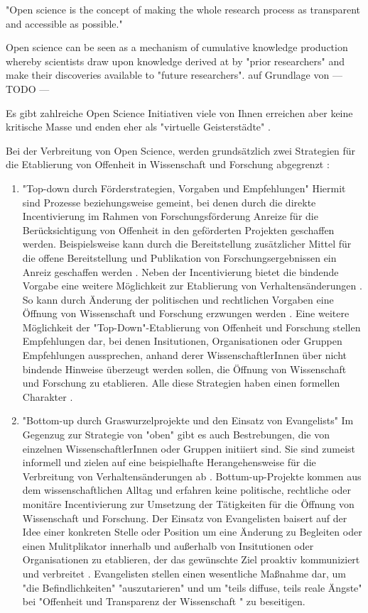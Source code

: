"Open science is the concept of making the whole research process as transparent and accessible as possible."\cite{Scheliga_2014}

Open science can be seen as a mechanism of cumulative knowledge production whereby scientists draw upon knowledge derived at by "prior researchers" and make their discoveries available to "future researchers". \cite{Scheliga_2014} auf Grundlage von \cite{Mukherjee_2009}
--- TODO ---

Es gibt zahlreiche Open Science Initiativen \cite{Scheliga_2014} viele von Ihnen erreichen aber keine kritische Masse \cite{wrap_2010} und enden eher als "virtuelle Geisterstädte" \cite{Nielsen_2011}.

Bei der Verbreitung von Open Science, werden grundsätzlich zwei Strategien für die Etablierung von Offenheit in Wissenschaft und Forschung abgegrenzt \cite{schulze_2013_open}: 
\begin{enumerate}
\item "Top-down durch Förderstrategien, Vorgaben und Empfehlungen"
Hiermit sind Prozesse beziehungsweise gemeint, bei denen durch die direkte Incentivierung im Rahmen von Forschungsförderung Anreize für die Berücksichtigung von Offenheit in den geförderten Projekten geschaffen werden. Beispielsweise kann durch die Bereitstellung zusätzlicher Mittel für die offene Bereitstellung und Publikation von Forschungsergebnissen ein Anreiz geschaffen werden  \cite{suchen}. Neben der Incentivierung bietet die bindende Vorgabe eine weitere Möglichkeit zur Etablierung von Verhaltensänderungen \cite{suchen}. So kann durch Änderung der politischen und rechtlichen Vorgaben eine Öffnung von Wissenschaft und Forschung erzwungen werden \cite{suchen}. Eine weitere Möglichkeit der "Top-Down"-Etablierung von Offenheit und Forschung stellen Empfehlungen dar, bei denen Insitutionen, Organisationen oder Gruppen Empfehlungen aussprechen, anhand derer WissenschaftlerInnen über nicht bindende Hinweise überzeugt werden sollen, die Öffnung von Wissenschaft und Forschung zu etablieren. Alle diese Strategien haben einen formellen Charakter \cite{suchen}.
\item "Bottom-up durch Graswurzelprojekte und den Einsatz von Evangelists"
Im Gegenzug zur Strategie von "oben" gibt es auch Bestrebungen, die von einzelnen WissenschaftlerInnen oder Gruppen initiiert sind. Sie sind zumeist informell und zielen auf eine beispielhafte Herangehensweise für die Verbreitung von Verhaltensänderungen ab \cite{suchen}. Bottum-up-Projekte kommen aus dem wissenschaftlichen Alltag und erfahren keine politische, rechtliche oder monitäre Incentivierung zur Umsetzung der Tätigkeiten für die Öffnung von Wissenschaft und Forschung. Der Einsatz von Evangelisten baisert auf der Idee einer konkreten Stelle oder Position um eine Änderung zu Begleiten \cite{suchen} oder einen Mulitplikator innerhalb und außerhalb von Insitutionen oder Organisationen zu etablieren, der das gewünschte Ziel proaktiv kommuniziert und verbreitet \cite{suchen}. Evangelisten stellen einen wesentliche Maßnahme dar, um "die Befindlichkeiten" "auszutarieren" und um "teils diffuse, teils reale Ängste" bei "Offenheit und Transparenz der Wissenschaft "\cite{schulze_2013_open} zu beseitigen.
\end{enumerate} 

